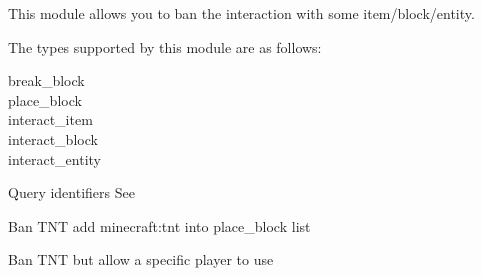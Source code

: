 
This module allows you to ban the interaction with some item/block/entity.

The types supported by this module are as follows:
\begin{description}
    \item [break\_block]
    \item [place\_block]
    \item [interact\_item]
    \item [interact\_block]
    \item [interact\_entity]
\end{description}

\begin{tips}{Query identifiers}
    See~
\end{tips}

\begin{example}{Ban TNT}
    add minecraft:tnt into place\_block list
\end{example}

\begin{example}{Ban TNT but allow a specific player to use}
\end{example}


